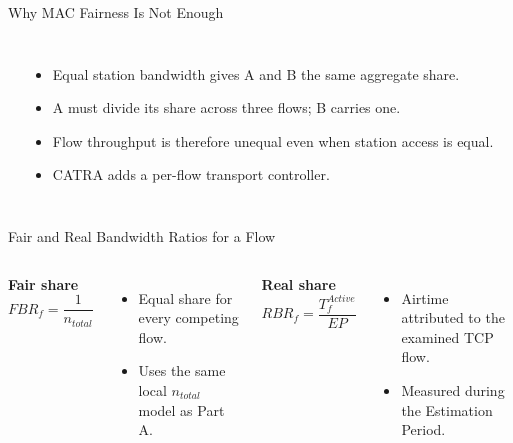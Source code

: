 \MethodStyle
{}

\begin{frame}{Why MAC Fairness Is Not Enough}
\begin{columns}[T,onlytextwidth]
\begin{center}
\end{center}
\begin{itemize}
\item Equal station bandwidth gives A and B the same aggregate share.
\item A must divide its share across three flows; B carries one.
\item Flow throughput is therefore unequal even when station access is equal.
\item CATRA adds a per-flow transport controller.
\end{itemize}
\end{columns}
\vspace{0.35cm}
\end{frame}

\begin{frame}{Fair and Real Bandwidth Ratios for a Flow}
\small
\begin{columns}[T,onlytextwidth]
\textbf{Fair share}
\[
\boxed{FBR_f=\frac{1}{n_{total}}}
\]
\begin{itemize}
\item Equal share for every competing flow.
\item Uses the same local $n_{total}$ model as Part A.
\end{itemize}
\textbf{Real share}
\[
\boxed{RBR_f=\frac{T_f^{Active}}{EP}}
\]
\begin{itemize}
\item Airtime attributed to the examined TCP flow.
\item Measured during the Estimation Period.
\end{itemize}
\end{columns}
\vspace{0.05cm}
\end{frame}

